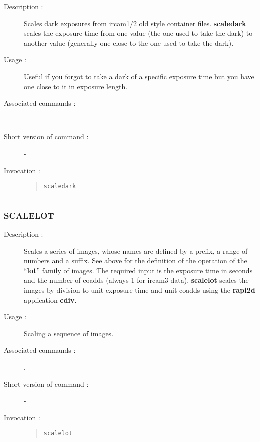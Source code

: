\begin{description}

\item[Description :] Scales dark exposures from {\sc ircam1/2} old
style container files. {\bf scaledark} scales the exposure time from one
value (the one used to take the dark) to another value (generally one
close to the one used to take the dark).

\item[Usage :] Useful if you forgot to take a dark of a specific exposure
time but you have one close to it in exposure length.
\item[Associated commands :] -
\item[Short version of command :] -
\item[Invocation :]

\begin{quote}{\tt  scaledark }\end{quote}

\end{description}

\hrule
\subsubsection*{\label{SCALELOT}SCALELOT}

\begin{description}

\item[Description :] Scales a series of images, whose names are defined by a
prefix, a range of numbers and a suffix. See above for the definition
of the operation of the ``{\bf lot}'' family of images.  The required
input is the exposure time in seconds and the number of coadds (always
1 for {\sc ircam3} data).  {\bf scalelot} scales the images by division
to unit exposure time and unit coadds using the {\bf rapi2d}
application {\bf cdiv}.

\item[Usage :] Scaling a sequence of images.

\item[Associated commands :] {\tt {}},
{\tt {}}

\item[Short version of command :] -
\item[Invocation :]

\begin{quote}{\tt  scalelot }\end{quote}

\end{description}

